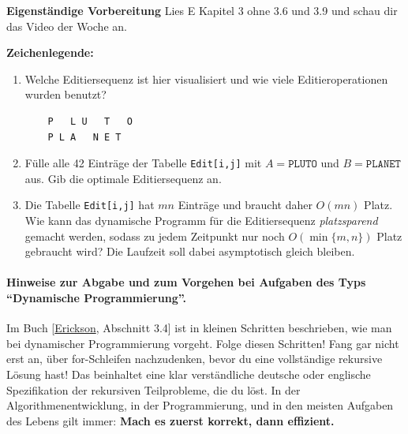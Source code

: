 \documentclass{uebung_cs}
\begin{document}
\textbf{Eigenständige Vorbereitung}
Lies  E Kapitel 3 ohne 3.6 und 3.9 und schau dir das  Video der Woche an.

\textbf{Zeichenlegende:}
\legende{}


\begin{aufgabe}[Editieren]\mbox{}
    \begin{enumerate}
        \item\bestehen Welche Editiersequenz ist hier visualisiert und wie viele Editieroperationen wurden benutzt?
\begin{verbatim}
    P   L U   T   O
    P L A   N E T
\end{verbatim}
        \item\bestehen Fülle alle 42 Einträge der Tabelle \texttt{Edit[i,j]} mit $A=\texttt{PLUTO}$ und $B=\texttt{PLANET}$ aus. Gib die optimale Editiersequenz an.
        \item\mittel Die Tabelle \texttt{Edit[i,j]} hat $mn$ Einträge und braucht daher $O(mn)$ Platz. Wie kann das dynamische Programm für die Editiersequenz \emph{platzsparend} gemacht werden, sodass zu jedem Zeitpunkt nur noch ${O(\min\{m,n\})}$ Platz gebraucht wird? Die Laufzeit soll dabei asymptotisch gleich bleiben.
    \end{enumerate}
\end{aufgabe}

\paragraph{Hinweise zur Abgabe und zum Vorgehen bei Aufgaben des Typs \enquote{Dynamische Programmierung}.}
Im Buch [\href{https://jeffe.cs.illinois.edu/teaching/algorithms/book/Algorithms-JeffE.pdf}{Erickson}, Abschnitt 3.4] ist in kleinen Schritten beschrieben, wie man bei dynamischer Programmierung vorgeht.
Folge diesen Schritten!
Fang gar nicht erst an, über for-Schleifen nachzudenken, bevor du eine vollständige rekursive Lösung hast! Das beinhaltet eine klar verständliche deutsche oder englische Spezifikation der rekursiven Teilprobleme, die du löst.
In der Algorithmenentwicklung, in der Programmierung, und in den meisten Aufgaben des Lebens gilt immer: \textbf{Mach es zuerst korrekt, dann effizient.}
\end{document}

